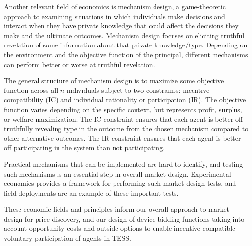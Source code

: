 Another relevant field of economics is mechanism design, a game-theoretic approach to examining situations in which individuals make decisions and interact when they have private knowledge that could affect the decisions they make and the ultimate outcomes. Mechanism design focuses on eliciting truthful revelation of some information about that private knowledge/type. Depending on the environment and the objective function of the principal, different mechanisms can perform better or worse at truthful revelation.

The general structure of mechanism design is to maximize some objective function across all $n$ individuals subject to two constraints: incentive compatibility (IC) and individual rationality or participation (IR). The objective function varies depending on the specific context, but represents profit, surplus, or welfare maximization. The IC constraint ensures that each agent is better off truthfully revealing type in the outcome from the chosen mechanism compared to other alternative outcomes. The IR constraint ensures that each agent is better off participating in the system than not participating. 

Practical mechanisms that can be implemented are hard to identify, and testing such mechanisms is an essential step in overall market design. Experimental economics provides a framework for performing such market design tests, and field deployments are an example of these important tests.

These economic fields and principles inform our overall approach to market design for price discovery, and our design of device bidding functions taking into account opportunity costs and outside options to enable incentive compatible voluntary participation of agents in TESS.



